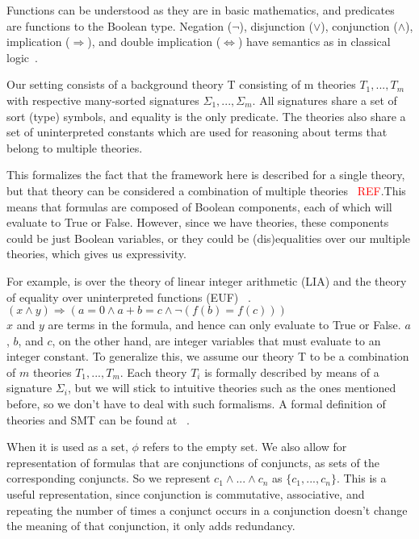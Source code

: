 \documentclass{article}
\begin{document}
Functions can be understood as they are in basic mathematics, 
and predicates are functions to the Boolean type. Negation 
($\neg$), disjunction ($\lor$), conjunction ($\land$), implication ($\Rightarrow$), and double implication
($\iff$) have semantics as in classical logic~\cite{prop}.

Our setting consists of a background theory T consisting 
of m theories $T_1, ..., T_m$ with respective many-sorted 
signatures $\Sigma_1, ..., \Sigma_m$. All signatures share 
a set of sort (type) symbols, and equality is the only 
predicate. The theories also share a set of 
uninterpreted constants which are used for reasoning about 
terms that belong to multiple theories. 

This formalizes the fact that the framework here is 
described for a single theory, but that theory can 
be considered a combination of multiple theories~\cite{Manna2003}
\textcolor{red}{REF}.This means that formulas are 
composed of Boolean components, each of which will 
evaluate to True or False. However, since 
we have theories, these components could be just Boolean 
variables, or they could be (dis)equalities over our 
multiple theories, which gives us expressivity. 

For example, is over the theory of linear integer 
arithmetic (LIA) and the theory of 
equality over uninterpreted functions (EUF)
~\cite{LIAEUF}.\\
$(x \land y) \Rightarrow (a = 0 \land a + b = c \land 
\neg (f(b) = f(c)))$ \\
$x$ and $y$ are terms in the 
formula, and hence can only evaluate to True or False.
$a$, $b$, and $c$, on the other hand, are integer variables 
that must evaluate to an integer constant. To generalize 
this, we assume our theory T to be a combination of $m$ 
theories $T_1, ..., T_m$. Each theory $T_i$ is formally 
described by means of a signature $\Sigma_i$, but we 
will stick to intuitive theories such as the ones mentioned 
before, so we don't have to deal with such formalisms. A 
formal definition of theories and SMT can be found at 
~\cite{DBLP:reference/mc/BarrettT18}.

When it is used as a set, $\phi$ refers to the empty set. We also allow for representation of formulas that are 
conjunctions of conjuncts, as sets of the corresponding 
conjuncts. So we represent $c_1 \land ... \land c_n$ as
$\{c_1, ..., c_n\}$. This is a useful representation, 
since conjunction is commutative, associative, and 
repeating the number of times a conjunct occurs in a 
conjunction doesn't change the meaning of that conjunction, 
it only adds redundancy.
\end{document}
